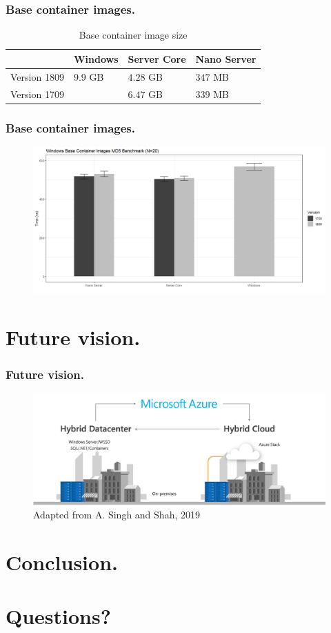 \documentclass[aspectratio=169]{beamer}
\begin{document}
\begin{frame}
\frametitle{Base container images.}  
  \begin{table}
    \begin{tabular}{llll}
        \toprule
        & \textbf{Windows} & \textbf{Server Core} & \textbf{Nano Server} \\
        \midrule
       Version 1809 & $9.9$ GB & $4.28$ GB              & $347$ MB \\
        \midrule
        Version 1709 & & $6.47$ GB              & $339$ MB \\
        \bottomrule
    \end{tabular}
    \caption{Base container image size}
\end{table}
\end{frame}
\begin{frame}
\frametitle{Base container images.}  
\vspace{0.5cm}
\begin{figure}
    \includegraphics[height=.8\textheight]{../bachproef/img/Methodologie/Containers1.png}
\end{figure}
\end{frame}

\section{Future vision.}
\begin{frame}
\frametitle{Future vision.}  
\vspace{0.5cm}
\begin{figure}
    \includegraphics[height=.7\textheight]{../bachproef/img/Toekomstvisie/Azure1.png}
    \caption{Adapted from A. Singh and Shah, 2019}
\end{figure}
\end{frame}
\section{Conclusion.}

\section{Questions?}
\end{document}
